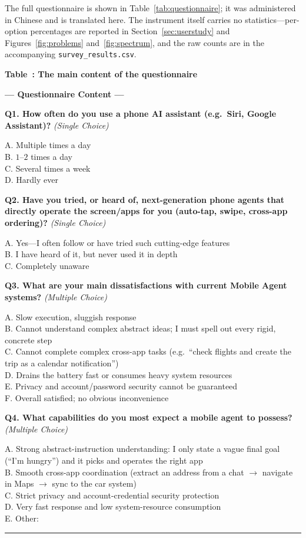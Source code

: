 \documentclass[11pt]{article}
\newcommand{\qq}[2]{\noindent\textbf{#1} {\itshape\footnotesize\color{black!55}(#2)}\par\nobreak\smallskip}
\begin{document}
The full questionnaire is shown in Table~\ref{tab:questionnaire}; it was
administered in Chinese and is translated here. The instrument itself carries no
statistics---per-option percentages are reported in Section~\ref{sec:userstudy}
and Figures~\ref{fig:problems} and~\ref{fig:spectrum}, and the raw counts are in
the accompanying \texttt{survey\_results.csv}.

\bigskip
{}\label{tab:questionnaire}%
{\centering\textbf{Table~\thetable: The main content of the questionnaire}\par}
\smallskip

\begin{mdframed}[style=qbox]
\setlength{\parindent}{0pt}%
{\centering\textbf{--- Questionnaire Content ---}\par}
\medskip

\qq{Q1. How often do you use a phone AI assistant (e.g.\ Siri, Google Assistant)?}{Single Choice}
A. Multiple times a day\\
B. $1$--$2$ times a day\\
C. Several times a week\\
D. Hardly ever

\medskip
\qq{Q2. Have you tried, or heard of, next-generation phone agents that directly operate the screen/apps for you (auto-tap, swipe, cross-app ordering)?}{Single Choice}
A. Yes---I often follow or have tried such cutting-edge features\\
B. I have heard of it, but never used it in depth\\
C. Completely unaware

\medskip
\qq{Q3. What are your main dissatisfactions with current Mobile Agent systems?}{Multiple Choice}
A. Slow execution, sluggish response\\
B. Cannot understand complex abstract ideas; I must spell out every rigid, concrete step\\
C. Cannot complete complex cross-app tasks (e.g.\ ``check flights and create the trip as a calendar notification'')\\
D. Drains the battery fast or consumes heavy system resources\\
E. Privacy and account/password security cannot be guaranteed\\
F. Overall satisfied; no obvious inconvenience

\medskip
\qq{Q4. What capabilities do you most expect a mobile agent to possess?}{Multiple Choice}
A. Strong abstract-instruction understanding: I only state a vague final goal (``I'm hungry'') and it picks and operates the right app\\
B. Smooth cross-app coordination (extract an address from a chat $\rightarrow$ navigate in Maps $\rightarrow$ sync to the car system)\\
C. Strict privacy and account-credential security protection\\
D. Very fast response and low system-resource consumption\\
E. Other:\ \rule{3cm}{0.4pt}


\end{mdframed}
\end{document}
